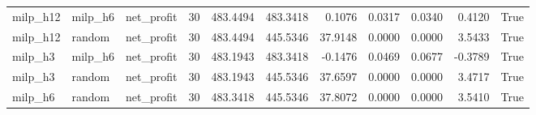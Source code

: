 \begin{tabular}{lllrrrrrrrr}
milp_h12 & milp_h6 & net_profit & 30 & 483.4494 & 483.3418 & 0.1076 & 0.0317 & 0.0340 & 0.4120 & True \\
milp_h12 & random & net_profit & 30 & 483.4494 & 445.5346 & 37.9148 & 0.0000 & 0.0000 & 3.5433 & True \\
milp_h3 & milp_h6 & net_profit & 30 & 483.1943 & 483.3418 & -0.1476 & 0.0469 & 0.0677 & -0.3789 & True \\
milp_h3 & random & net_profit & 30 & 483.1943 & 445.5346 & 37.6597 & 0.0000 & 0.0000 & 3.4717 & True \\
milp_h6 & random & net_profit & 30 & 483.3418 & 445.5346 & 37.8072 & 0.0000 & 0.0000 & 3.5410 & True \\
\bottomrule
\end{tabular}
